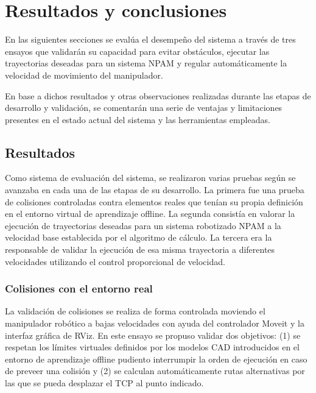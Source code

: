 \section{Resultados y conclusiones}
En las siguientes secciones se evalúa el desempeño del sistema a través de tres ensayos que validarán su capacidad para evitar obstáculos, ejecutar las trayectorias deseadas para un sistema \acrshort{NPAM} y regular automáticamente la velocidad de movimiento del manipulador.

En base a dichos resultados y otras observaciones realizadas durante las etapas de desarrollo y validación, se comentarán una serie de ventajas y limitaciones presentes en el estado actual del sistema y las herramientas empleadas.

\subsection{Resultados}
Como sistema de evaluación del sistema, se realizaron varias pruebas según se avanzaba en cada una de las etapas de su desarrollo. La primera fue una prueba de colisiones controladas contra elementos reales que tenían su propia definición en el entorno virtual de aprendizaje offline. La segunda consistía en valorar la ejecución de trayectorias deseadas para un sistema robotizado \acrshort{NPAM} a la velocidad base establecida por el algoritmo de cálculo. La tercera era la responsable de validar la ejecución de esa misma trayectoria a diferentes velocidades utilizando el control proporcional de velocidad.

\subsubsection*{Colisiones con el entorno real}
\hypertarget{Colisiones con el entorno real}{}

La validación de colisiones se realiza de forma controlada moviendo el manipulador robótico a bajas velocidades con ayuda del controlador Moveit y la interfaz gráfica de RViz. En este ensayo se propuso validar dos objetivos: (1) se respetan los límites virtuales definidos por los modelos \acrshort{CAD} introducidos en el entorno de aprendizaje offline pudiento interrumpir la orden de ejecución en caso de preveer una colisión y (2) se calculan automáticamente rutas alternativas por las que se pueda desplazar el \acrshort{TCP} al punto indicado.

